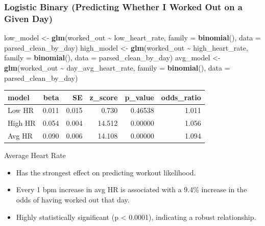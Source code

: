 \documentclass[
  11pt,
]{article}
\newenvironment{Shaded}{\begin{snugshade}}{\end{snugshade}}
\newcommand{\AttributeTok}[1]{\textcolor[rgb]{0.13,0.29,0.53}{#1}}
\newcommand{\FunctionTok}[1]{\textcolor[rgb]{0.13,0.29,0.53}{\textbf{#1}}}
\newcommand{\NormalTok}[1]{#1}
\newcommand{\OtherTok}[1]{\textcolor[rgb]{0.56,0.35,0.01}{#1}}
\newcommand{\SpecialCharTok}[1]{\textcolor[rgb]{0.81,0.36,0.00}{\textbf{#1}}}
\providecommand{\tightlist}{%
  \setlength{\itemsep}{0pt}\setlength{\parskip}{0pt}}
\begin{document}
\subsubsection{Logistic Binary (Predicting Whether I Worked Out on a
Given
Day)}\label{logistic-binary-predicting-whether-i-worked-out-on-a-given-day}

\begin{Shaded}
\begin{Highlighting}[]
\NormalTok{low\_model }\OtherTok{\textless{}{-}} \FunctionTok{glm}\NormalTok{(worked\_out }\SpecialCharTok{\textasciitilde{}}\NormalTok{ low\_heart\_rate, }\AttributeTok{family =} \FunctionTok{binomial}\NormalTok{(), }\AttributeTok{data =}\NormalTok{ parsed\_clean\_by\_day)}
\NormalTok{high\_model }\OtherTok{\textless{}{-}} \FunctionTok{glm}\NormalTok{(worked\_out }\SpecialCharTok{\textasciitilde{}}\NormalTok{ high\_heart\_rate, }\AttributeTok{family =} \FunctionTok{binomial}\NormalTok{(), }\AttributeTok{data =}\NormalTok{ parsed\_clean\_by\_day)}
\NormalTok{avg\_model }\OtherTok{\textless{}{-}} \FunctionTok{glm}\NormalTok{(worked\_out }\SpecialCharTok{\textasciitilde{}}\NormalTok{ day\_avg\_heart\_rate, }\AttributeTok{family =} \FunctionTok{binomial}\NormalTok{(), }\AttributeTok{data =}\NormalTok{ parsed\_clean\_by\_day)}
\end{Highlighting}
\end{Shaded}

\begin{longtable}[]{@{}lrrrrr@{}}
\toprule\noalign{}
model & beta & SE & z\_score & p\_value & odds\_ratio \\
\midrule\noalign{}
\endhead
\bottomrule\noalign{}
\endlastfoot
Low HR & 0.011 & 0.015 & 0.730 & 0.46538 & 1.011 \\
High HR & 0.054 & 0.004 & 14.512 & 0.00000 & 1.056 \\
Avg HR & 0.090 & 0.006 & 14.108 & 0.00000 & 1.094 \\
\end{longtable}

Average Heart Rate

\begin{itemize}
\tightlist
\item
  Has the strongest effect on predicting workout likelihood.
\item
  Every 1 bpm increase in avg HR is associated with a 9.4\% increase in
  the odds of having worked out that day.
\item
  Highly statistically significant (p \textless{} 0.0001), indicating a
  robust relationship.
\end{itemize}
\end{document}
